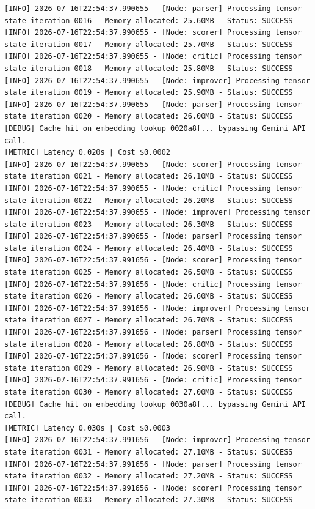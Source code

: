 \documentclass[10pt,journal,compsoc]{IEEEtran}
\begin{document}
\begin{verbatim}
[INFO] 2026-07-16T22:54:37.990655 - [Node: parser] Processing tensor state iteration 0016 - Memory allocated: 25.60MB - Status: SUCCESS
[INFO] 2026-07-16T22:54:37.990655 - [Node: scorer] Processing tensor state iteration 0017 - Memory allocated: 25.70MB - Status: SUCCESS
[INFO] 2026-07-16T22:54:37.990655 - [Node: critic] Processing tensor state iteration 0018 - Memory allocated: 25.80MB - Status: SUCCESS
[INFO] 2026-07-16T22:54:37.990655 - [Node: improver] Processing tensor state iteration 0019 - Memory allocated: 25.90MB - Status: SUCCESS
[INFO] 2026-07-16T22:54:37.990655 - [Node: parser] Processing tensor state iteration 0020 - Memory allocated: 26.00MB - Status: SUCCESS
[DEBUG] Cache hit on embedding lookup 0020a8f... bypassing Gemini API call.
[METRIC] Latency 0.020s | Cost $0.0002
[INFO] 2026-07-16T22:54:37.990655 - [Node: scorer] Processing tensor state iteration 0021 - Memory allocated: 26.10MB - Status: SUCCESS
[INFO] 2026-07-16T22:54:37.990655 - [Node: critic] Processing tensor state iteration 0022 - Memory allocated: 26.20MB - Status: SUCCESS
[INFO] 2026-07-16T22:54:37.990655 - [Node: improver] Processing tensor state iteration 0023 - Memory allocated: 26.30MB - Status: SUCCESS
[INFO] 2026-07-16T22:54:37.990655 - [Node: parser] Processing tensor state iteration 0024 - Memory allocated: 26.40MB - Status: SUCCESS
[INFO] 2026-07-16T22:54:37.991656 - [Node: scorer] Processing tensor state iteration 0025 - Memory allocated: 26.50MB - Status: SUCCESS
[INFO] 2026-07-16T22:54:37.991656 - [Node: critic] Processing tensor state iteration 0026 - Memory allocated: 26.60MB - Status: SUCCESS
[INFO] 2026-07-16T22:54:37.991656 - [Node: improver] Processing tensor state iteration 0027 - Memory allocated: 26.70MB - Status: SUCCESS
[INFO] 2026-07-16T22:54:37.991656 - [Node: parser] Processing tensor state iteration 0028 - Memory allocated: 26.80MB - Status: SUCCESS
[INFO] 2026-07-16T22:54:37.991656 - [Node: scorer] Processing tensor state iteration 0029 - Memory allocated: 26.90MB - Status: SUCCESS
[INFO] 2026-07-16T22:54:37.991656 - [Node: critic] Processing tensor state iteration 0030 - Memory allocated: 27.00MB - Status: SUCCESS
[DEBUG] Cache hit on embedding lookup 0030a8f... bypassing Gemini API call.
[METRIC] Latency 0.030s | Cost $0.0003
[INFO] 2026-07-16T22:54:37.991656 - [Node: improver] Processing tensor state iteration 0031 - Memory allocated: 27.10MB - Status: SUCCESS
[INFO] 2026-07-16T22:54:37.991656 - [Node: parser] Processing tensor state iteration 0032 - Memory allocated: 27.20MB - Status: SUCCESS
[INFO] 2026-07-16T22:54:37.991656 - [Node: scorer] Processing tensor state iteration 0033 - Memory allocated: 27.30MB - Status: SUCCESS

\end{verbatim}
\end{document}

